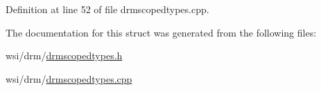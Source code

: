 Definition at line 52 of file drmscopedtypes.\+cpp.


\begin{DoxyCode}{0}
\end{DoxyCode}


The documentation for this struct was generated from the following files\+:\begin{DoxyCompactItemize}
\item 
wsi/drm/\mbox{\hyperlink{drmscopedtypes_8h}{drmscopedtypes.\+h}}\item 
wsi/drm/\mbox{\hyperlink{drmscopedtypes_8cpp}{drmscopedtypes.\+cpp}}\end{DoxyCompactItemize}
